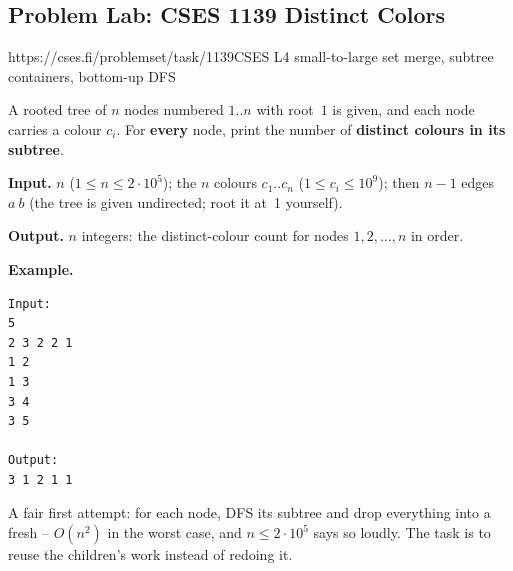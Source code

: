 \subsection{Problem Lab: CSES 1139 Distinct Colors}

  {https://cses.fi/problemset/task/1139}{CSES L4}
  {small-to-large set merge, subtree containers, bottom-up DFS}

\begin{problemstatement}
A rooted tree of \(n\) nodes numbered \(1..n\) with root~\(1\) is given, and
each node carries a colour \(c_i\).  For \textbf{every} node, print the number
of \textbf{distinct colours in its subtree}.

\textbf{Input.} \(n\) (\(1\le n\le 2\cdot10^5\)); the \(n\) colours
\(c_1..c_n\) (\(1\le c_i\le10^9\)); then \(n-1\) edges \(a\ b\) (the tree is
given undirected; root it at~1 yourself).

\textbf{Output.} \(n\) integers: the distinct-colour count for nodes
\(1,2,\dots,n\) in order.

\textbf{Example.}
\begin{verbatim}
Input:
5
2 3 2 2 1
1 2
1 3
3 4
3 5

Output:
3 1 2 1 1
\end{verbatim}
\end{problemstatement}

\begin{attemptgate}
A fair first attempt: for each node, DFS its subtree and drop everything into
a fresh  -- \(O(n^2)\) in the worst case, and \(n\le2\cdot10^5\) says
so loudly.  The task is to reuse the children's work instead of redoing it.
\end{attemptgate}

